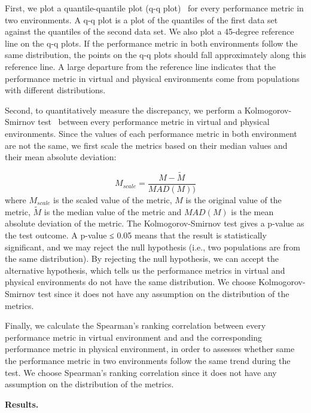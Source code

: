 First, we plot a quantile-quantile plot (q-q plot)~\cite{qqplots} for every performance metric in two environments. A q-q plot is a plot of the quantiles of the first data set against the quantiles of the second data set. We also plot a 45-degree reference line on the q-q plots. If the performance metric in both environments follow the same distribution, the points on the q-q plots should fall approximately along this reference line. A large departure from the reference line indicates that the performance metric in virtual and physical environments come from populations with different distributions. 

Second, to quantitatively measure the discrepancy, we perform a Kolmogorov-Smirnov test~\cite{kstest} between every performance metric in virtual and physical environments. Since the values of each performance metric in both environment are not the same, we first scale the metrics based on their median values and their mean absolute deviation: 

	\[
		M_{scale}=\frac{M-\tilde{M}}{MAD(M))}		
	\]
where $M_{scale}$ is the scaled value of the metric, $M$ is the original value of the metric, $\tilde{M}$ is the median value of the metric and $MAD(M)$ is the mean absolute deviation of the metric. The Kolmogorov-Smirnov test gives a p-value as the test outcome. A p-value ≤ 0.05 means that the result is statistically significant, and we may reject the null hypothesis (i.e., two populations are from the same distribution). By rejecting the null hypothesis, we can accept the alternative hypothesis, which tells us the performance metrics in virtual and physical environments do not have the same distribution. We choose Kolmogorov-Smirnov test since it does not have any assumption on the distribution of the metrics.

Finally, we calculate the Spearman's ranking correlation between every performance metric in virtual environment and and the corresponding performance metric in physical environment, in order to assesses whether same the performance metric in two environments follow the same trend during the test. We choose Spearman's ranking correlation since it does not have any assumption on the distribution of the metrics. 

\noindent \textbf{Results.}

